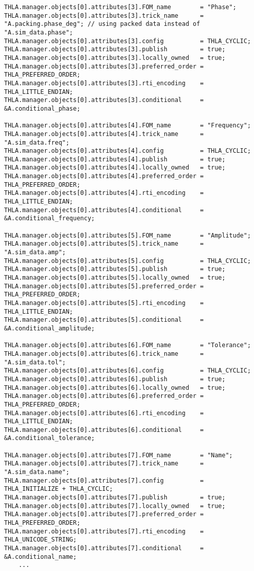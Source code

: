\begin{lstlisting}[numbers=none,caption={Conditional {\tt input} file changes},label={list:sine-conditional-input-changes}]
THLA.manager.objects[0].attributes[3].FOM_name        = "Phase";
THLA.manager.objects[0].attributes[3].trick_name      = "A.packing.phase_deg"; // using packed data instead of "A.sim_data.phase";
THLA.manager.objects[0].attributes[3].config          = THLA_CYCLIC;
THLA.manager.objects[0].attributes[3].publish         = true;
THLA.manager.objects[0].attributes[3].locally_owned   = true;
THLA.manager.objects[0].attributes[3].preferred_order = THLA_PREFERRED_ORDER;
THLA.manager.objects[0].attributes[3].rti_encoding    = THLA_LITTLE_ENDIAN;
THLA.manager.objects[0].attributes[3].conditional     = &A.conditional_phase;

THLA.manager.objects[0].attributes[4].FOM_name        = "Frequency";
THLA.manager.objects[0].attributes[4].trick_name      = "A.sim_data.freq";
THLA.manager.objects[0].attributes[4].config          = THLA_CYCLIC;
THLA.manager.objects[0].attributes[4].publish         = true;
THLA.manager.objects[0].attributes[4].locally_owned   = true;
THLA.manager.objects[0].attributes[4].preferred_order = THLA_PREFERRED_ORDER;
THLA.manager.objects[0].attributes[4].rti_encoding    = THLA_LITTLE_ENDIAN;
THLA.manager.objects[0].attributes[4].conditional     = &A.conditional_frequency;

THLA.manager.objects[0].attributes[5].FOM_name        = "Amplitude";
THLA.manager.objects[0].attributes[5].trick_name      = "A.sim_data.amp";
THLA.manager.objects[0].attributes[5].config          = THLA_CYCLIC;
THLA.manager.objects[0].attributes[5].publish         = true;
THLA.manager.objects[0].attributes[5].locally_owned   = true;
THLA.manager.objects[0].attributes[5].preferred_order = THLA_PREFERRED_ORDER;
THLA.manager.objects[0].attributes[5].rti_encoding    = THLA_LITTLE_ENDIAN;
THLA.manager.objects[0].attributes[5].conditional     = &A.conditional_amplitude;

THLA.manager.objects[0].attributes[6].FOM_name        = "Tolerance";
THLA.manager.objects[0].attributes[6].trick_name      = "A.sim_data.tol";
THLA.manager.objects[0].attributes[6].config          = THLA_CYCLIC;
THLA.manager.objects[0].attributes[6].publish         = true;
THLA.manager.objects[0].attributes[6].locally_owned   = true;
THLA.manager.objects[0].attributes[6].preferred_order = THLA_PREFERRED_ORDER;
THLA.manager.objects[0].attributes[6].rti_encoding    = THLA_LITTLE_ENDIAN;
THLA.manager.objects[0].attributes[6].conditional     = &A.conditional_tolerance;

THLA.manager.objects[0].attributes[7].FOM_name        = "Name";
THLA.manager.objects[0].attributes[7].trick_name      = "A.sim_data.name";
THLA.manager.objects[0].attributes[7].config          = THLA_INITIALIZE + THLA_CYCLIC;
THLA.manager.objects[0].attributes[7].publish         = true;
THLA.manager.objects[0].attributes[7].locally_owned   = true;
THLA.manager.objects[0].attributes[7].preferred_order = THLA_PREFERRED_ORDER;
THLA.manager.objects[0].attributes[7].rti_encoding    = THLA_UNICODE_STRING;
THLA.manager.objects[0].attributes[7].conditional     = &A.conditional_name;
    ...
\end{lstlisting}

